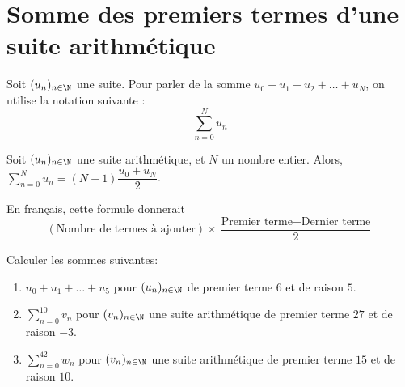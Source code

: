 \documentclass{article}
\begin{document}
\section{Somme des premiers termes d'une suite arithmétique}
\begin{tcolorbox}
\begin{definition}
Soit $(u_n)_{n \in \N}$ une suite. Pour parler de la somme $u_0 + u_1 + u_2 + \dots + u_N$, on utilise la notation suivante :
\begin{equation*}
\sum_{n=0}^{N} u_n
\end{equation*}
\end{definition}
\end{tcolorbox}
\begin{proposition}
Soit $(u_n)_{n \in \N}$ une suite arithmétique, et $N$ un nombre entier. Alors,
$\sum_{n=0}^{N} u_n = (N + 1) \dfrac{u_0 + u_N}{2}$.
\end{proposition}
\begin{remark}
En français, cette formule donnerait
\begin{equation*}
(\text{Nombre de termes à ajouter}) \times \dfrac{\text{Premier terme} + \text{Dernier terme}}{2}
\end{equation*}
\end{remark}
\begin{example}
Calculer les sommes suivantes:
\begin{enumerate}[label=\emph{\alph*)}]
\item $u_0 + u_1 + \dots + u_5$ pour $(u_n)_{n \in \N}$ de premier terme $6$ et de raison $5$.
\item $\sum_{n = 0}^{10} v_n$ pour $(v_n)_{n \in \N}$ une suite arithmétique de premier terme $27$ et de raison $-3$.
\item $\sum_{n = 0}^{42} w_n$ pour $(v_n)_{n \in \N}$ une suite arithmétique de premier terme $15$ et de raison $10$.
\end{enumerate}
\emptybox{8cm} 
\end{example}
\end{document}
